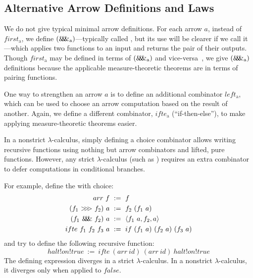 \documentclass[preprint]{sigplanconf}
\newcommand{\arrowarr}{\ensuremath{arr}}
\newcommand{\arrowcomp}{\ensuremath{{>}\mspace{-6mu}{>}\mspace{-6mu}{>}}}
\newcommand{\arrowpair}{\ensuremath{\mathit{\&\mspace{-7.5mu}\&\mspace{-7.5mu}\&}}}
\newcommand{\arrowif}{\ensuremath{ifte}}
\newcommand{\gen}{_\mathrm{a}}
\begin{document}
\subsection{Alternative Arrow Definitions and Laws}
\label{sec:arrow-definitions}

We do not give typical minimal arrow definitions.
For each arrow $a$, instead of $first\gen$, we define $(\arrowpair\gen)$---typically called , but its use will be clearer if we call it ---which applies two functions to an input and returns the pair of their outputs.
Though $first\gen$ may be defined in terms of $(\arrowpair\gen)$ and vice-versa~\cite{cit:hughes-2005afp-arrows}, we give $(\arrowpair\gen)$ definitions because the applicable measure-theoretic theorems are in terms of pairing functions.

One way to strengthen an arrow $a$ is to define an additional combinator $left\gen$, which can be used to choose an arrow computation based on the result of another.
Again, we define a different combinator, $\arrowif\gen$ (``if-then-else''), to make applying measure-theoretic theorems easier.

In a nonstrict $\lambda$-calculus, simply defining a choice combinator allows writing recursive functions using nothing but arrow combinators and lifted, pure functions.
However, any strict $\lambda$-calculus (such as \lzfclang) requires an extra combinator to defer computations in conditional branches.

For example, define the  with choice:
\begin{equation}
\begin{aligned}
	\arrowarr~f &\ := \ f \\
	(f_1~\arrowcomp~f_2)~a &\ := \ f_2~(f_1~a) \\
	(f_1~\arrowpair~f_2)~a &\ := \ \pair{f_1~a,f_2,a} \\
	\arrowif~f_1~f_2~f_3~a &\ := \ if~(f_1~a)~(f_2~a)~(f_3~a) \\
\end{aligned}
\label{eqn:function-arrow}
\end{equation}
and try to define the following recursive function:
\begin{equation}
	halt!on!true \ := \ \arrowif~(\arrowarr~id)~(\arrowarr~id)~halt!on!true
\end{equation}
The defining expression diverges in a strict $\lambda$-calculus.
In a nonstrict $\lambda$-calculus, it diverges only when applied to $false$.
\end{document}
